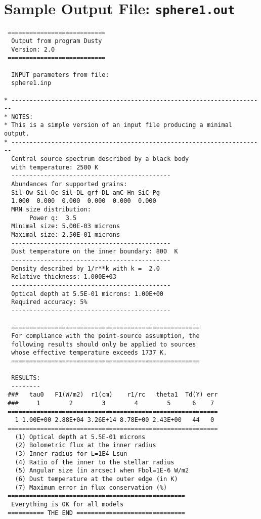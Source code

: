 \documentclass[12pt]{article} \usepackage{epsf}
\def\Section#1{\section{\sc #1}}
\begin{document}
\vspace {1cm}

\Section{Sample Output File: {\tt sphere1.out}} \label{sphere1}

\begin{verbatim}
 ===========================
  Output from program Dusty
  Version: 2.0
 ===========================

  INPUT parameters from file:
  sphere1.inp

* ----------------------------------------------------------------------
* NOTES:
* This is a simple version of an input file producing a minimal output.
* ----------------------------------------------------------------------
  Central source spectrum described by a black body
  with temperature: 2500 K
  --------------------------------------------
  Abundances for supported grains:
  Sil-Ow Sil-Oc Sil-DL grf-DL amC-Hn SiC-Pg
  1.000  0.000  0.000  0.000  0.000  0.000
  MRN size distribution:
       Power q:  3.5
  Minimal size: 5.00E-03 microns
  Maximal size: 2.50E-01 microns
  --------------------------------------------
  Dust temperature on the inner boundary: 800  K
  --------------------------------------------
  Density described by 1/r**k with k =  2.0
  Relative thickness: 1.000E+03
  --------------------------------------------
  Optical depth at 5.5E-01 microns: 1.00E+00
  Required accuracy: 5%
  --------------------------------------------

  ====================================================
  For compliance with the point-source assumption, the
  following results should only be applied to sources
  whose effective temperature exceeds 1737 K.
  ====================================================

  RESULTS:
  --------
 ###   tau0   F1(W/m2)  r1(cm)    r1/rc   theta1  Td(Y) err
 ###     1        2        3        4        5      6    7
 ==========================================================
   1 1.00E+00 2.88E+04 3.26E+14 8.78E+00 2.43E+00   44   0
 ==========================================================
   (1) Optical depth at 5.5E-01 microns
   (2) Bolometric flux at the inner radius
   (3) Inner radius for L=1E4 Lsun
   (4) Ratio of the inner to the stellar radius
   (5) Angular size (in arcsec) when Fbol=1E-6 W/m2
   (6) Dust temperature at the outer edge (in K)
   (7) Maximum error in flux conservation (%)
 =================================================
  Everything is OK for all models
 ========== THE END ==============================
\end{verbatim}
\end{document}
